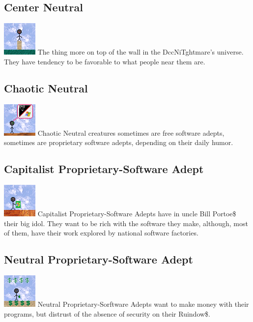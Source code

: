 \documentclass[ letterpaper,12pt]{article}
\begin{document}
\subsection{Center Neutral}
\includegraphics{../data/alignment/Img/muro.png}
The thing more on top of the wall in the DccNiTghtmare's universe.  They have
tendency to be favorable to what people near them are.

\subsection{Chaotic Neutral}
\includegraphics{../data/alignment/Img/yang.png}
Chaotic Neutral creatures sometimes are free software adepts, sometimes are
proprietary software adepts, depending on their daily humor.

\subsection{Capitalist Proprietary-Software Adept}
\includegraphics{../data/alignment/Img/ruindows.png}
Capitalist Proprietary-Software Adepts have in uncle Bill Portoe\$ their big
idol. They want to be rich with the software they make, although, most of them,
have their work explored by national software factories.

\subsection{Neutral Proprietary-Software Adept}
\includegraphics{../data/alignment/Img/cifrao.png}
Neutral Proprietary-Sorftware Adepts want to make money with their programs,
but distrust of the absence of security on their Ruindow\$.
\end{document}
